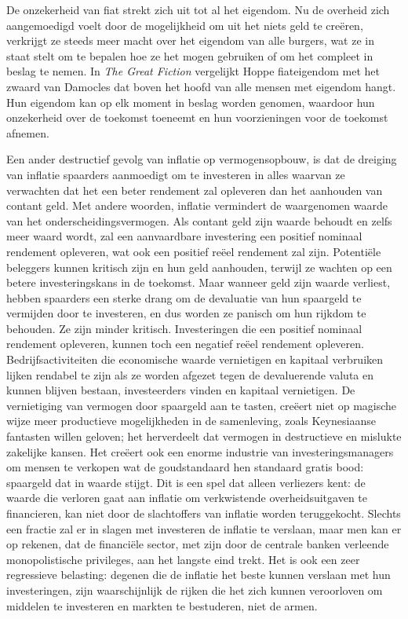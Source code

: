 De onzekerheid van fiat strekt zich uit tot al het eigendom. Nu de overheid zich aangemoedigd voelt door de mogelijkheid om uit het niets geld te creëren, verkrijgt ze steeds meer macht over het eigendom van alle burgers, wat ze in staat stelt om te bepalen hoe ze het mogen gebruiken of om het compleet in beslag te nemen. In \emph{The Great Fiction} vergelijkt Hoppe fiateigendom met het zwaard van Damocles dat boven het hoofd van alle mensen met eigendom hangt. Hun eigendom kan op elk moment in beslag worden genomen, waardoor hun onzekerheid over de toekomst toeneemt en hun voorzieningen voor de toekomst afnemen.\autocite{152}

Een ander destructief gevolg van inflatie op vermogensopbouw, is dat de dreiging van inflatie spaarders aanmoedigt om te investeren in alles waarvan ze verwachten dat het een beter rendement zal opleveren dan het aanhouden van contant geld. Met andere woorden, inflatie vermindert de waargenomen waarde van het onderscheidingsvermogen. Als contant geld zijn waarde behoudt en zelfs meer waard wordt, zal een aanvaardbare investering een positief nominaal rendement opleveren, wat ook een positief reëel rendement zal zijn. Potentiële beleggers kunnen kritisch zijn en hun geld aanhouden, terwijl ze wachten op een betere investeringskans in de toekomst. Maar wanneer geld zijn waarde verliest, hebben spaarders een sterke drang om de devaluatie van hun spaargeld te vermijden door te investeren, en dus worden ze panisch om hun rijkdom te behouden. Ze zijn minder kritisch. Investeringen die een positief nominaal rendement opleveren, kunnen toch een negatief reëel rendement opleveren. Bedrijfsactiviteiten die economische waarde vernietigen en kapitaal verbruiken lijken rendabel te zijn als ze worden afgezet tegen de devaluerende valuta en kunnen blijven bestaan, investeerders vinden en kapitaal vernietigen. De vernietiging van vermogen door spaargeld aan te tasten, creëert niet op magische wijze meer productieve mogelijkheden in de samenleving, zoals Keynesiaanse fantasten willen geloven; het herverdeelt dat vermogen in destructieve en mislukte zakelijke kansen. Het creëert ook een enorme industrie van investeringsmanagers om mensen te verkopen wat de goudstandaard hen standaard gratis bood: spaargeld dat in waarde stijgt. Dit is een spel dat alleen verliezers kent: de waarde die verloren gaat aan inflatie om verkwistende overheidsuitgaven te financieren, kan niet door de slachtoffers van inflatie worden teruggekocht. Slechts een fractie zal er in slagen met investeren de inflatie te verslaan, maar men kan er op rekenen, dat de financiële sector, met zijn door de centrale banken verleende monopolistische privileges, aan het langste eind trekt. Het is ook een zeer regressieve belasting: degenen die de inflatie het beste kunnen verslaan met hun investeringen, zijn waarschijnlijk de rijken die het zich kunnen veroorloven om middelen te investeren en markten te bestuderen, niet de armen.


